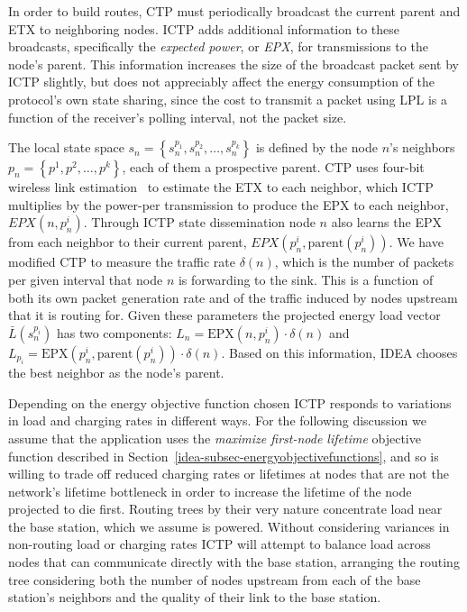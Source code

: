 In order to build routes, CTP must periodically broadcast the current parent
and ETX to neighboring nodes.  ICTP adds additional information to these
broadcasts, specifically the {\em expected power}, or {\em EPX}, for
transmissions to the node's parent. This information increases the size of
the broadcast packet sent by ICTP slightly, but does not appreciably affect
the energy consumption of the protocol's own state sharing, since the cost to
transmit a packet using LPL is a function of the receiver's polling interval,
not the packet size.

The local state space $s_n = \left\{s_n^{p_1}, s_n^{p_2}, \ldots, s_n^{p_k}
\right\}$ is defined by the node $n$'s neighbors $p_n = \left\{p^1, p^2,
\ldots, p^k \right\}$, each of them a prospective parent. CTP uses four-bit
wireless link estimation~\cite{Fonseca07} to estimate the ETX to each
neighbor, which ICTP multiplies by the power-per transmission to produce the
EPX to each neighbor, $EPX(n, p_n^i)$. Through ICTP state dissemination node
$n$ also learns the EPX from each neighbor to their current parent,
$EPX(p_n^i, \textrm{parent}(p_n^i))$. We have modified CTP to measure the
traffic rate $\delta(n)$, which is the number of packets per given interval
that node $n$ is forwarding to the sink. This is a function of both its own
packet generation rate and of the traffic induced by nodes upstream that it
is routing for. Given these parameters the projected energy load vector
$\bar{L}(s_n^{p_i})$ has two components: $L_n = \textrm{EPX}(n, p_n^i) \cdot
\delta(n)$ and $L_{p_i} = \textrm{EPX}(p_n^i, \textrm{parent}(p_n^i)) \cdot
\delta(n)$. Based on this information, IDEA chooses the best neighbor as the
node's parent.

Depending on the energy objective function chosen ICTP responds to variations
in load and charging rates in different ways. For the following discussion we
assume that the application uses the \textit{maximize first-node lifetime}
objective function described in
Section~\ref{idea-subsec-energyobjectivefunctions}, and so is willing to trade off
reduced charging rates or lifetimes at nodes that are not the network's
lifetime bottleneck in order to increase the lifetime of the node projected
to die first. Routing trees by their very nature concentrate load near the
base station, which we assume is powered. Without considering variances in
non-routing load or charging rates ICTP will attempt to balance load across
nodes that can communicate directly with the base station, arranging the
routing tree considering both the number of nodes upstream from each of the
base station's neighbors and the quality of their link to the base station.

